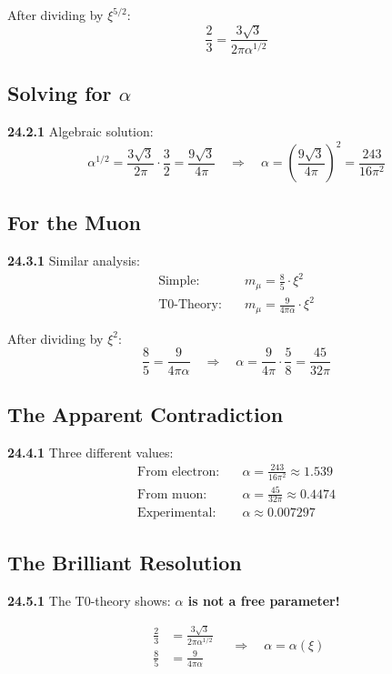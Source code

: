\documentclass[12pt,a4paper]{article}
\begin{document}
After dividing by $\xi^{5/2}$:
\[
\frac{2}{3} = \frac{3\sqrt{3}}{2\pi\alpha^{1/2}}
\]

\subsection{Solving for $\alpha$}

\noindent \textbf{24.2.1} Algebraic solution:
\[
\alpha^{1/2} = \frac{3\sqrt{3}}{2\pi} \cdot \frac{3}{2} = \frac{9\sqrt{3}}{4\pi}
\quad \Rightarrow \quad
\alpha = \left(\frac{9\sqrt{3}}{4\pi}\right)^2 = \frac{243}{16\pi^2}
\]

\subsection{For the Muon}

\noindent \textbf{24.3.1} Similar analysis:
\begin{align*}
	\text{Simple:} &\quad m_\mu = \frac{8}{5} \cdot \xi^2 \\
	\text{T0-Theory:} &\quad m_\mu = \frac{9}{4\pi\alpha} \cdot \xi^2
\end{align*}

After dividing by $\xi^2$:
\[
\frac{8}{5} = \frac{9}{4\pi\alpha}
\quad \Rightarrow \quad
\alpha = \frac{9}{4\pi} \cdot \frac{5}{8} = \frac{45}{32\pi}
\]

\subsection{The Apparent Contradiction}

\noindent \textbf{24.4.1} Three different values:
\begin{align*}
	\text{From electron:} &\quad \alpha = \frac{243}{16\pi^2} \approx 1.539 \\
	\text{From muon:} &\quad \alpha = \frac{45}{32\pi} \approx 0.4474 \\
	\text{Experimental:} &\quad \alpha \approx 0.007297
\end{align*}

\subsection{The Brilliant Resolution}

\noindent \textbf{24.5.1} The T0-theory shows: \textbf{$\alpha$ is not a free parameter!}

\[
\boxed{
	\begin{aligned}
		\frac{2}{3} &= \frac{3\sqrt{3}}{2\pi\alpha^{1/2}} \\
		\frac{8}{5} &= \frac{9}{4\pi\alpha}
	\end{aligned}
	\quad \Rightarrow \quad
	\alpha = \alpha(\xi)
}
\]
\end{document}
